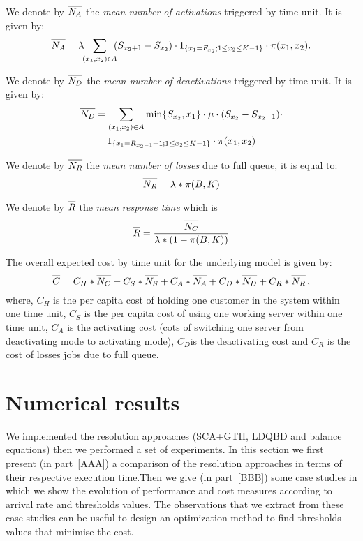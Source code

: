 \documentclass[conference]{IEEEtran}
\begin{document}
We denote by $\overline{\mathstrut N_{A}}$ the 
\emph{mean number of activations} triggered by time unit.
It is given by:
\begin{equation}
\overline{\mathstrut N_{A}}= 
\lambda \! \! \sum_{(x_{1},x_{2}) \in \! A} \! \! (S_{x_2+1} -  S_{x_2}) \cdot 1_{\{x_{1}=F_{x_2} ; 1 \leq x_2 \leq K-1\}} \cdot \pi(x_{1},x_{2}) .
\end{equation}

We denote by $\overline{\mathstrut N_{D}}$ the
\emph{mean number of deactivations} triggered by time unit. It is given by:
\begin{multline}
\overline{\mathstrut N_{D}}=\sum_{(x_{1},x_{2}) \in A} \min\{S_{x_{2}},x_{1}\} \cdot \mu \cdot (S_{x_2}-S_{x_2-1}) \cdot \\
1_{\{x_{1}=R_{x_2-1}+1  \mbox{ ; } 1 \leq x_2 \leq K-1\}}
\cdot \pi(x_{1},x_{2})
\end{multline}

We denote by $\overline{\mathstrut N_{R}}$ the \emph{mean number of losses} due to full queue, it is equal to:
\begin{equation}
    \overline{\mathstrut N_{R}}=\lambda*\pi(B,K)
\end{equation}

We denote by $\overline{\mathstrut R}$ the \emph{mean response time} which is
\begin{equation}
    \label{formule:tempsreponse}
    \overline{\mathstrut R}=\frac{\overline{\mathstrut N_{C}}}{\lambda*(1-\pi(B,K))}
\end{equation}

The overall expected cost by time unit for the underlying model is given by:
\begin{equation}
    \label{formule:cost}
    \overline{\mathstrut C}=C_{H}*\overline{\mathstrut N_{C}}+C_{S}*\overline{\mathstrut N_{S}}+C_{A}*\overline{\mathstrut N_{A}}+C_{D}*\overline{\mathstrut N_{D}}+C_{R}*\overline{\mathstrut N_{R}} \, ,
\end{equation}
where, $C_{H}$ is the per capita cost of holding one customer in the system within one time unit,
$C_{S}$ is the per capita cost of using one working server within one time unit,
 $C_{A}$ is the activating cost (cots of switching one server from deactivating mode to activating mode),
 $C_{D}$is the deactivating cost  and   $C_{R}$ is the cost of losses jobs due to full queue.

\section{Numerical results}\label{sec:ResNum}
We implemented the resolution approaches (SCA+GTH, LDQBD and balance equations) then we performed a set of experiments. In this section we first 
present (in part~\ref{AAA}) a comparison of the resolution approaches in terms of their respective execution time.Then we give (in part~\ref{BBB}) some case studies in which we show the evolution of performance and cost measures according to arrival rate and thresholds values. The observations that we extract from these case studies can be useful to design an optimization method to find thresholds values that minimise the cost.
\end{document}
